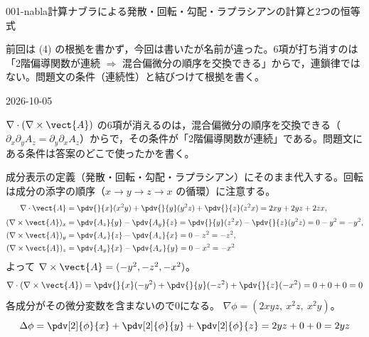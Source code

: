 \documentclass[uplatex,dvipdfmx,a4paper,11pt]{jsarticle}
\begin{document}
\begin{mondai}{001-nabla}{計算}{ナブラによる発散・回転・勾配・ラプラシアンの計算と2つの恒等式}
\begin{kizuki}
\item {} 前回は (4) の根拠を書かず，今回は書いたが名前が違った。6項が打ち消すのは「2階偏導関数が連続 $\Rightarrow$ 混合偏微分の順序を交換できる」からで，連鎖律ではない。問題文の条件（連続性）と結びつけて根拠を書く。
\end{kizuki}
\begin{maekizuki}{2026-10-05}
\item $\nabla\cdot(\nabla\times\vect{A})$ の6項が消えるのは，混合偏微分の順序を交換できる（$\partial_{x}\partial_{y}A_{z}=\partial_{y}\partial_{x}A_{z}$）からで，その条件が「2階偏導関数が連続」である。問題文にある条件は答案のどこで使ったかを書く。
\end{maekizuki}
\begin{tadashii}
\houshin 成分表示の定義（発散・回転・勾配・ラプラシアン）にそのまま代入する。回転は成分の添字の順序（$x\to y\to z\to x$ の循環）に注意する。
\keisan
{}
\begin{align*}
\nabla\cdot\vect{A}&=\pdv{}{x}(x^2y)+\pdv{}{y}(y^2z)+\pdv{}{z}(z^2x)=2xy+2yz+2zx,\\[2pt]
(\nabla\times\vect{A})_x&=\pdv{A_z}{y}-\pdv{A_y}{z}=\pdv{}{y}(z^2x)-\pdv{}{z}(y^2z)=0-y^2=-y^2,\\
(\nabla\times\vect{A})_y&=\pdv{A_x}{z}-\pdv{A_z}{x}=0-z^2=-z^2,\\
(\nabla\times\vect{A})_z&=\pdv{A_y}{x}-\pdv{A_x}{y}=0-x^2=-x^2
\end{align*}
よって $\nabla\times\vect{A}=(-y^2,-z^2,-x^2)$。
\[
\nabla\cdot(\nabla\times\vect{A})=\pdv{}{x}(-y^2)+\pdv{}{y}(-z^2)+\pdv{}{z}(-x^2)=0+0+0=0
\]
各成分がその微分変数を含まないので0になる。
$\nabla\phi=(2xyz,\ x^2z,\ x^2y)$。
\[
\Delta\phi=\pdv[2]{\phi}{x}+\pdv[2]{\phi}{y}+\pdv[2]{\phi}{z}=2yz+0+0=2yz
\]


\end{tadashii}
\end{mondai}
\end{document}
